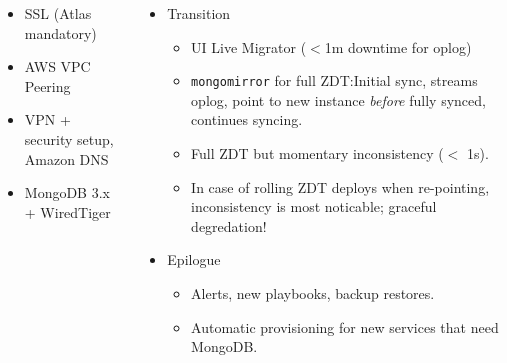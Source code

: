 \documentclass[xcolor=dvipsnames, 9pt]{beamer}
\begin{document}
\begin{frame}
\begin{columns}
\begin{column}{0.5\textwidth}
\begin{itemize}
                    \begin{itemize}
                        \item SSL (Atlas mandatory)
                        \item AWS VPC Peering
                        \item VPN + security setup, Amazon DNS
                        \item MongoDB 3.x + WiredTiger
                    \end{itemize}
            \end{itemize}
        \end{column}
        \begin{column}{0.5\textwidth}
            \begin{itemize}
                \item Transition
                    \begin{itemize}
                        \item UI Live Migrator ($<$1m downtime for oplog)
                        \item \texttt{mongomirror} for full ZDT:\@ Initial sync,
                            streams oplog, point to new instance \emph{before}
                            fully synced, continues syncing.
                        \item Full ZDT but momentary inconsistency ($<$ 1s).
                        \item In case of rolling ZDT deploys when re-pointing,
                            inconsistency is most noticable; graceful
                            degredation!
                    \end{itemize}
                \item Epilogue
                    \begin{itemize}
                        \item Alerts, new playbooks, backup restores.
                        \item Automatic provisioning for new services that need
                            MongoDB.%
                    \end{itemize}
            \end{itemize}
        \end{column}
    \end{columns}
\end{frame}
\end{document}
